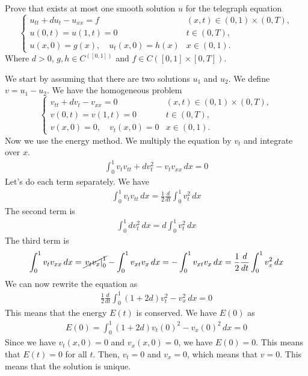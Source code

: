 \begin{exercise}
    Prove that exists at most one smooth solution \(u\) for the telegraph equation
    \[
        \begin{cases}
            u_{tt} + d u_t - u_{xx} = f & (x, t) \in (0,1) \times (0, T), \\
            u(0, t) = u(1, t) = 0 & t \in (0, T), \\
            u(x, 0) = g(x), \quad u_t(x, 0) = h(x) & x \in (0, 1).
        \end{cases}
    \]
    Where \(d > 0\), \(g, h \in C^([0, 1])\) and \(f \in C([0, 1] \times [0, T])\).
\end{exercise}
We start by assuming that there are two solutions \(u_1\) and \(u_2\). We define \(v = u_1 - u_2\). We have the homogeneous problem
\[
    \begin{cases}
        v_{tt} + d v_t - v_{xx} = 0 & (x, t) \in (0,1) \times (0, T), \\
        v(0, t) = v(1, t) = 0 & t \in (0, T), \\
        v(x, 0) = 0, \quad v_t(x, 0) = 0 & x \in (0, 1).
    \end{cases}
\]
Now we use the energy method. We multiply the equation by \(v_t\) and integrate over \(x\).
\[
    \begin{split}
        \int_0^1 v_t v_{tt} + d v_t^2 - v_t v_{xx} \, dx = 0
    \end{split}
\]
Let's do each term separately. We have
\[
    \begin{split}
        \int_0^1 v_t v_{tt} \, dx = \frac{1}{2} \frac{d}{dt} \int_0^1 v_t^2 \, dx
    \end{split}
\]
The second term is
\[
    \begin{split}
        \int_0^1 d v_t^2 \, dx = d \int_0^1 v_t^2 \, dx
    \end{split}
\]
The third term is
\[
    \begin{split}
        \int_0^1 v_t v_{xx} \, dx = \cancel{\left. v_t v_x \right|_0^1} - \int_0^1 v_{xt} v_x \, dx = -\int_0^1 v_{xt} v_x \, dx = \frac{1}{2} \frac{d}{dt} \int_0^1 v_x^2 \, dx
    \end{split}
\]  
We can now rewrite the equation as
\[
    \begin{split}
        \frac{1}{2} \frac{d}{dt} \int_0^1 (1 + 2d) v_t^2 - v_x^2 \, dx = 0
    \end{split}
\]
This means that the energy \(E(t)\) is conserved. We have \(E(0)\) as
\[
    \begin{split}
        E(0) = \int_0^1 (1 + 2d) v_t(0)^2 - v_x(0)^2 \, dx = 0
    \end{split}
\]
Since we have \(v_t(x,0) = 0\) and \(v_x(x,0) = 0\), we have \(E(0) = 0\). This means that \(E(t) = 0\) for all \(t\). Then, \(v_t = 0\) and \(v_x = 0\), which means that \(v = 0\). This means that the solution is unique.

